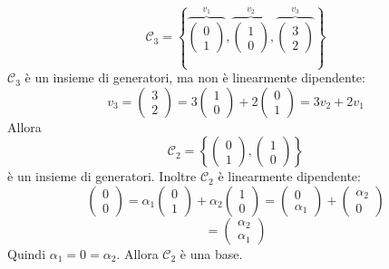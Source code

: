 \documentclass[12pt]{article}
\begin{document}
\[\mathcal{C}_3 = \left\{\overbrace{\begin{pmatrix}
    0\\
    1
\end{pmatrix}}^{v_1}, \overbrace{\begin{pmatrix}
    1\\
    0
\end{pmatrix}}^{v_2}, \overbrace{\begin{pmatrix}
    3\\
    2
\end{pmatrix}}^{v_3}\right\}\]
$\mathcal{C}_3$ è un insieme di generatori, ma non è linearmente dipendente:
\[v_3 = \begin{pmatrix}
    3\\
    2
\end{pmatrix} = 3 \begin{pmatrix}
    1\\
    0
\end{pmatrix} + 2 \begin{pmatrix}
    0\\
    1
\end{pmatrix} = 3v_2 + 2v_1\]
Allora
\[\mathcal{C}_2 = \left\{\begin{pmatrix}
    0\\
    1
\end{pmatrix}, \begin{pmatrix}
    1\\
    0
\end{pmatrix}\right\}\]
è un insieme di generatori. Inoltre $\mathcal{C}_2$ è linearmente dipendente:
\[\begin{pmatrix}
    0\\
    0
\end{pmatrix} = \alpha_1 \begin{pmatrix}
    0\\
    1
\end{pmatrix} + \alpha_2 \begin{pmatrix}
    1\\
    0
\end{pmatrix} = \begin{pmatrix}
    0\\
    \alpha_1
\end{pmatrix} + \begin{pmatrix}
    \alpha_2\\
    0
\end{pmatrix}\]
\[= \begin{pmatrix}
    \alpha_2\\
    \alpha_1
\end{pmatrix}\]
Quindi $\alpha_1 = 0 = \alpha_2$. Allora $\mathcal{C}_2$ è una base.
\end{document}
